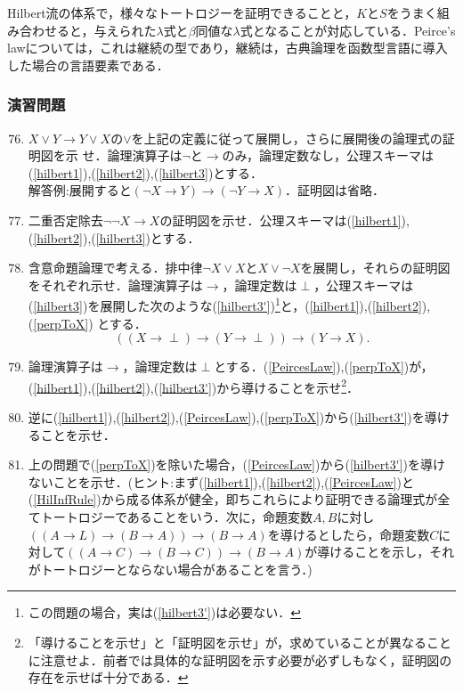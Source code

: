 \documentclass{ltjsarticle}
\theoremstyle{mystyle1}
\theoremstyle{mystyle3}
\theoremstyle{mystyle2}
\begin{document}
Hilbert流の体系で，様々なトートロジーを証明できることと，$K$と$S$をうまく組み合わせると，与えられた$\lambda$式と$\beta$同値な$\lambda$式となることが対応している．Peirce's lawについては，これは継続の型であり，継続は，古典論理を函数型言語に導入した場合の言語要素である．
\subsubsection*{演習問題}
\begin{enumerate}
  \setcounter{enumi}{75}
  \item $X\vee Y\to Y\vee X$の$\vee$を上記の定義に従って展開し，さらに展開後の論理式の証明図を示 せ．論理演算子は$\neg$と$\to$のみ，論理定数なし，公理スキーマは(\ref{hilbert1}),(\ref{hilbert2}),(\ref{hilbert3})とする．\\解答例:展開すると$\left(\neg X\to Y\right)\to\left(\neg Y\to X\right)$．証明図は省略．
  \item 二重否定除去$\neg\neg X\to X$の証明図を示せ．公理スキーマは(\ref{hilbert1}),(\ref{hilbert2}),(\ref{hilbert3})とする．
  \item 含意命題論理で考える．排中律$\neg X\vee X$と$X\vee\neg X$を展開し，それらの証明図をそれぞれ示せ．論理演算子は$\to$，論理定数は$\perp$，公理スキーマは(\ref{hilbert3})を展開した次のような(\ref{hilbert3'})\footnote{この問題の場合，実は(\ref{hilbert3'})は必要ない．}と，(\ref{hilbert1}),(\ref{hilbert2}),(\ref{perpToX}) とする．
        \begin{equation}
          \left(\left(X\to\perp\right)\to\left(Y\to\perp\right)\right)\to\left(Y\to X\right).\tag{15'}\label{hilbert3'}
        \end{equation}
  \item 論理演算子は$\to$，論理定数は$\perp$とする．(\ref{PeircesLaw}),(\ref{perpToX})が，(\ref{hilbert1}),(\ref{hilbert2}),(\ref{hilbert3'})から導けることを示せ\footnote{「導けることを示せ」と「証明図を示せ」が，求めていることが異なることに注意せよ．前者では具体的な証明図を示す必要が必ずしもなく，証明図の存在を示せば十分である．}．
  \item 逆に(\ref{hilbert1}),(\ref{hilbert2}),(\ref{PeircesLaw}),(\ref{perpToX})から(\ref{hilbert3'})を導けることを示せ．
  \item 上の問題で(\ref{perpToX})を除いた場合，(\ref{PeircesLaw})から(\ref{hilbert3'})を導けないことを示せ．(ヒント:まず(\ref{hilbert1}),(\ref{hilbert2}),(\ref{PeircesLaw})と(\ref{HilInfRule})から成る体系が健全，即ちこれらにより証明できる論理式が全てトートロジーであることをいう．次に，命題変数$A, B$に対し$\left(\left(A\to L\right)\to\left(B\to A\right)\right)\to\left(B\to A\right)$を導けるとしたら，命題変数$C$に対して$\left(\left(A\to C\right)\to\left(B\to C\right)\right)\to\left(B\to A\right)$が導けることを示し，それがトートロジーとならない場合があることを言う．)
\end{enumerate}
\end{document}
